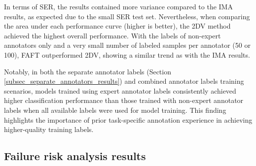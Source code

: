 \documentclass[a4paper,fleqn]{cas-dc}
\begin{document}
In terms of SER, the results contained more variance compared to the IMA results, as expected due to the small SER test set. Nevertheless, when comparing the area under each performance curve (higher is better), the 2DV method achieved the highest overall performance. With the labels of non-expert annotators only and a very small number of labeled samples per annotator (50 or 100), FAFT outperformed 2DV, showing a similar trend as with the IMA results.

Notably, in both the separate annotator labels (Section \ref{subsec_separate_annotators_results}) and combined annotator labels training scenarios, models trained using expert annotator labels consistently achieved higher classification performance than those trained with non-expert annotator labels when all available labels were used for model training. This finding highlights the importance of prior task-specific annotation experience in achieving higher-quality training labels.


\subsection{Failure risk analysis results} \label{subsec_failure_risk_analysis_results}
\end{document}
